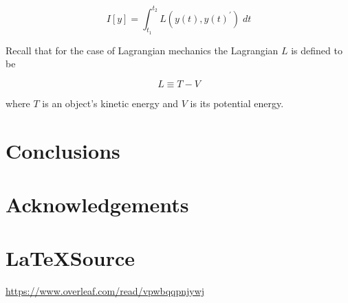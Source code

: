 \documentclass{article}
\theoremstyle{definition}
\begin{document}
\bigskip
\begin{equation*}
I[y] = \int_{t_1}^{t_2} L(y(t),y(t)^{\prime}) \; dt
\end{equation*}


\bigskip
\noindent
\bigskip
Recall that for the case of Lagrangian mechanics 
the Lagrangian $L$ is defined to be

\begin{equation*}
L \equiv T - V
\end{equation*}

\bigskip
\noindent
where $T$ is an object's kinetic energy and $V$ 
is its potential energy. 
%
%
%
\section{Conclusions}
%
%
%
\section*{Acknowledgements}
%
%
\section*{\LaTeX Source}
\url{https://www.overleaf.com/read/vpwbqqpnjywj}
%
%
%


%
%
\end{document}
